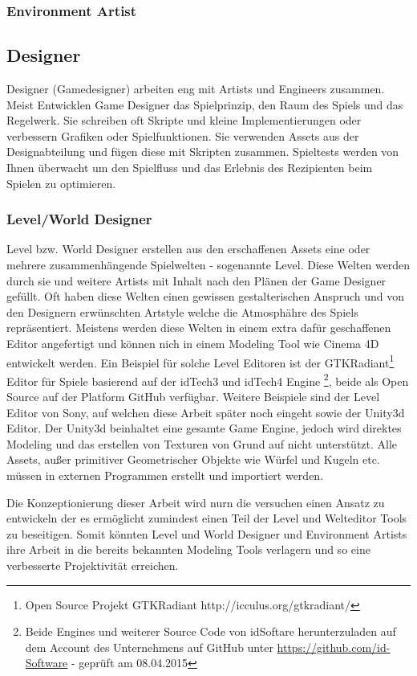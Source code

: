 \documentclass[pagesize, paper=a4, fontsize=12pt,titlepage=true, headings=small, headnosepline, abstractoff, liststotoc, nochapterprefix, plainheadsepline, twoside]{scrreprt}
\begin{document}
\subsubsection{Environment Artist}

\subsection{Designer}
Designer (Gamedesigner) arbeiten eng mit Artists und Engineers zusammen. Meist Entwicklen Game Designer das Spielprinzip, den Raum des Spiels und das Regelwerk. Sie schreiben oft Skripte und kleine Implementierungen oder verbessern Grafiken oder Spielfunktionen. Sie verwenden Assets aus der Designabteilung und fügen diese mit Skripten zusammen. Spieltests werden von Ihnen überwacht um den Spielfluss und das Erlebnis des Rezipienten beim Spielen zu optimieren.
\subsubsection{Level/World Designer}
Level bzw. World Designer erstellen aus den erschaffenen Assets eine oder mehrere zusammenhängende Spielwelten - sogenannte Level. Diese Welten werden durch sie und weitere Artists mit Inhalt nach den Plänen der Game Designer gefüllt. Oft haben diese Welten einen gewissen gestalterischen Anspruch und von den Designern erwünschten Artstyle welche die Atmosphähre des Spiels repräsentiert. Meistens werden diese Welten in einem extra dafür geschaffenen Editor angefertigt und können nich in einem Modeling Tool wie Cinema 4D entwickelt werden. Ein Beispiel für solche Level Editoren ist der GTKRadiant\footnote{Open Source Projekt GTKRadiant http://icculus.org/gtkradiant/} Editor für Spiele basierend auf der idTech3 und idTech4  Engine \footnote{Beide Engines und weiterer Source Code von idSoftare herunterzuladen auf dem Account des Unternehmens auf GitHub unter \url{https://github.com/id-Software} - geprüft am 08.04.2015}, beide als Open Source auf der Platform GitHub verfügbar. Weitere Beispiele sind der Level Editor von Sony, auf welchen diese Arbeit später noch eingeht sowie der Unity3d Editor. Der Unity3d beinhaltet eine gesamte Game Engine, jedoch wird direktes Modeling und das erstellen von Texturen von Grund auf nicht unterstützt. Alle Assets, außer primitiver Geometrischer Objekte wie Würfel und Kugeln etc. müssen in externen Programmen erstellt und importiert werden.

Die Konzeptionierung dieser Arbeit wird nurn die versuchen einen Ansatz zu entwickeln der es ermöglicht zumindest einen Teil der Level und Welteditor Tools zu beseitigen. Somit könnten Level und World Designer und Environment Artists ihre Arbeit in die bereits bekannten Modeling Tools verlagern und so eine verbesserte Projektivität erreichen.
\end{document}
